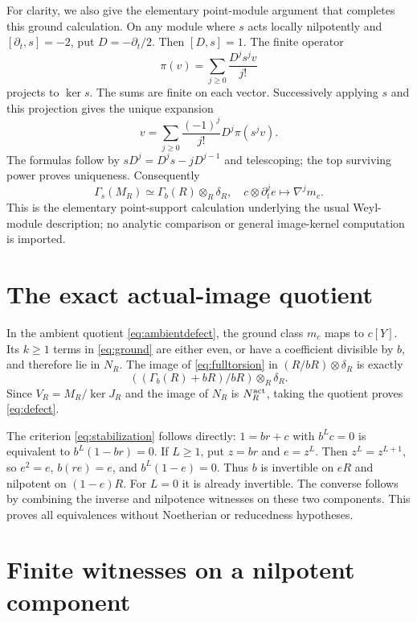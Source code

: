 \documentclass[11pt]{article}
\theoremstyle{definition}\newtheorem{definition}[theorem]{Definition}
\theoremstyle{remark}\newtheorem{remark}[theorem]{Remark}
\begin{document}
For clarity, we also give the elementary point-module argument
that completes this ground calculation. On any module where
$s$ acts locally nilpotently and $[\partial_t,s]=-2$, put
$D=-\partial_t/2$. Then $[D,s]=1$. The finite operator
\[
 \pi(v)=\sum_{j\ge0}\frac{D^js^jv}{j!}
\]
projects to $\ker s$. The sums are finite on each vector.
Successively applying $s$ and this projection gives the unique
expansion
\[
 v=\sum_{j\ge0}\frac{(-1)^j}{j!}D^j\pi(s^jv).
\]
The formulas follow by $sD^j=D^js-jD^{j-1}$ and telescoping;
the top surviving power proves uniqueness. Consequently
\begin{equation}\label{eq:fulltorsion}
 \Gamma_s(M_R)\simeq\Gamma_b(R)\otimes_R\delta_R,
 \quad c\otimes\partial_t^je\longmapsto\nabla^jm_c.
\end{equation}
This is the elementary point-support calculation underlying the
usual Weyl-module description; no analytic comparison or
general image-kernel computation is imported.

\section{The exact actual-image quotient}

In the ambient quotient \eqref{eq:ambientdefect}, the ground
class $m_c$ maps to $c[Y]$. Its $k\ge1$ terms in
\eqref{eq:ground} are either even, or have a coefficient
divisible by $b$, and therefore lie in $N_R$.
The image of \eqref{eq:fulltorsion} in
$(R/bR)\otimes\delta_R$ is exactly
\[
 ((\Gamma_b(R)+bR)/bR)\otimes_R\delta_R.
\]
Since $V_R=M_R/\ker J_R$ and the image of $N_R$ is
$N_R^{\rm act}$, taking the quotient proves
\eqref{eq:defect}.

The criterion \eqref{eq:stabilization} follows directly:
$1=br+c$ with $b^Lc=0$ is equivalent to
$b^L(1-br)=0$. If $L\ge1$, put $z=br$ and $e=z^L$.
Then $z^L=z^{L+1}$, so $e^2=e$, $b(re)=e$, and
$b^L(1-e)=0$. Thus $b$ is invertible on $eR$ and nilpotent
on $(1-e)R$. For $L=0$ it is already invertible. The converse
follows by combining the inverse and nilpotence witnesses on
these two components. This proves all equivalences without
Noetherian or reducedness hypotheses.

\section{Finite witnesses on a nilpotent component}
\end{document}
